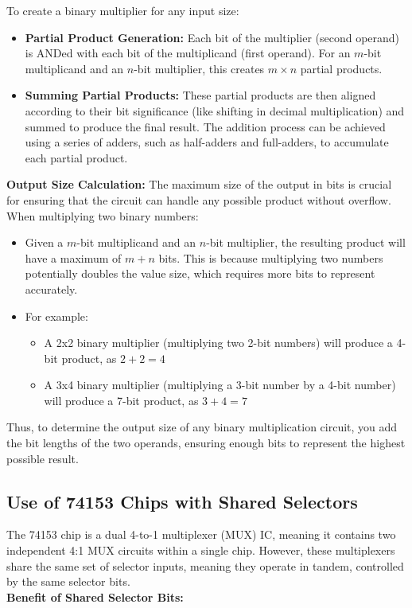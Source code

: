 \documentclass[12pt]{article}
\begin{document}
To create a binary multiplier for any input size:
\begin{itemize}
	\item \textbf{Partial Product Generation:} Each bit of the multiplier (second operand) is ANDed with each bit of the multiplicand (first operand). For an \( m \)-bit multiplicand and an \( n \)-bit multiplier, this creates \( m \times n \) partial products.
	\item \textbf{Summing Partial Products:} These partial products are then aligned according to their bit significance (like shifting in decimal multiplication) and summed to produce the final result. The addition process can be achieved using a series of adders, such as half-adders and full-adders, to accumulate each partial product.
\end{itemize}
\textbf{Output Size Calculation:}
The maximum size of the output in bits is crucial for ensuring that the circuit can handle any possible product without overflow. When multiplying two binary numbers:
\begin{itemize}
	\item Given a  \( m \)-bit multiplicand and an \( n \)-bit multiplier, the resulting product will have a maximum of \( m + n \) bits. This is because multiplying two numbers potentially doubles the value size, which requires more bits to represent accurately.
	\item For example:
	      \begin{itemize}
		      \item A 2x2 binary multiplier (multiplying two 2-bit numbers) will produce a 4-bit product, as \( 2 + 2 = 4 \)
		      \item A 3x4 binary multiplier (multiplying a 3-bit number by a 4-bit number) will produce a 7-bit product, as \( 3 + 4 = 7 \)
	      \end{itemize}
\end{itemize}

Thus, to determine the output size of any binary multiplication circuit, you add the bit lengths of the two operands, ensuring enough bits to represent the highest possible result.

\subsection*{Use of 74153 Chips with Shared Selectors}

The 74153 chip is a dual 4-to-1 multiplexer (MUX) IC, meaning it contains two independent 4:1 MUX circuits within a single chip. However, these multiplexers share the same set of selector inputs, meaning they operate in tandem, controlled by the same selector bits.\\
\textbf{Benefit of Shared Selector Bits:}
\end{document}

